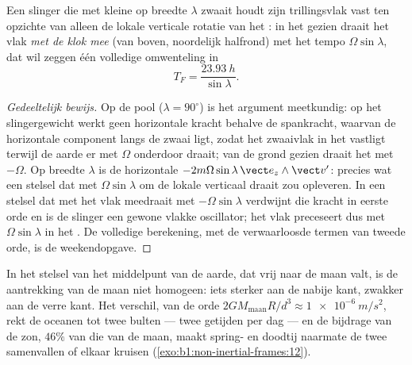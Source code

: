 \begin{proposition}\label{prop:b1:non-inertial-frames:foucault}
Een slinger die met kleine  op breedte $\lambda$ zwaait houdt zijn
trillingsvlak vast ten opzichte van alleen de lokale verticale rotatie van
het : in het  gezien draait het vlak
\emph{met de klok mee} (van boven, noordelijk halfrond) met het tempo
$\Omega\sin\lambda$, dat wil zeggen één volledige omwenteling in
\[
T_F = \frac{\qty{23.93}{h}}{\sin\lambda} .
\]
\end{proposition}

\begin{proof}[Gedeeltelijk bewijs]
Op de pool ($\lambda = 90^\circ$) is het argument meetkundig: op het slingergewicht
werkt geen horizontale kracht behalve de spankracht, waarvan de horizontale component
langs de zwaai ligt, zodat het zwaaivlak in het  vastligt
terwijl de aarde er met $\Omega$ onderdoor draait; van de grond gezien draait het
met $-\Omega$. Op breedte $\lambda$ is de horizontale 
$-2m\Omega\sin\lambda\,\vect e_z\wedge\vect v'$: precies wat een stelsel dat met
$\Omega\sin\lambda$ om de lokale verticaal draait zou opleveren. In een stelsel dat
met het vlak meedraait met $-\Omega\sin\lambda$ verdwijnt die kracht in eerste orde
en is de slinger een gewone vlakke oscillator; het vlak
preceseert dus met $\Omega\sin\lambda$ in het . De volledige
berekening, met de verwaarloosde termen van tweede orde, is de
weekendopgave.
\end{proof}

\begin{remark}\label{rem:b1:non-inertial-frames:tides}
In het stelsel van het middelpunt van de aarde, dat vrij naar de maan valt,
is de aantrekking van de maan niet homogeen: iets sterker aan de nabije kant,
zwakker aan de verre kant. Het verschil, van de orde $2GM_{\text{maan}}R/d^3
\approx \qty{1e-6}{m/s^2}$, rekt de oceanen tot twee bulten --- twee
getijden per dag --- en de bijdrage van de zon, $46\%$ van die van de maan, maakt
spring- en doodtij naarmate de twee samenvallen of elkaar kruisen
(\cref{exo:b1:non-inertial-frames:12}).
\end{remark}

